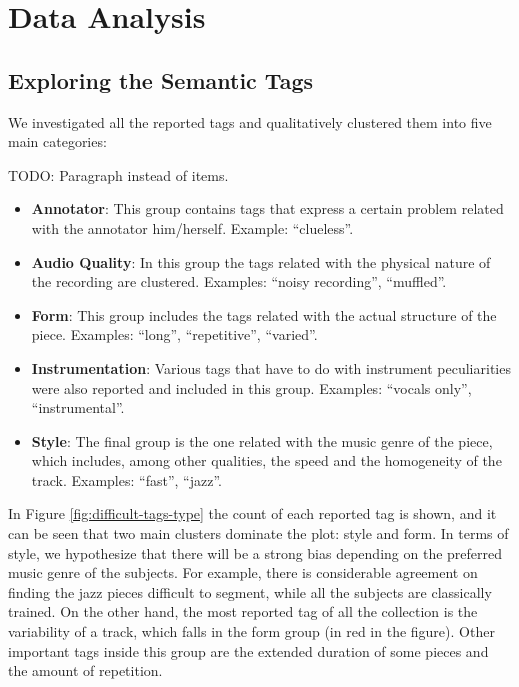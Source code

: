 \documentclass{article}
\begin{document}
\section{Data Analysis}

\subsection{Exploring the Semantic Tags}

We investigated all the reported tags and qualitatively clustered them into five main categories:

TODO: Paragraph instead of items.

\begin{itemize}
  \item
    \textbf{Annotator}: This group contains tags that express a certain problem related with the annotator him/herself. 
    Example: ``clueless''.

  \item
    \textbf{Audio Quality}: In this group the tags related with the physical nature of the recording are clustered. 
    Examples: ``noisy recording'', ``muffled''.

  \item
    \textbf{Form}: This group includes the tags related with the actual structure of the piece. Examples: ``long'', ``repetitive'', ``varied''.

  \item
    \textbf{Instrumentation}: Various tags that have to do with instrument peculiarities were also reported and included in this group. Examples: ``vocals only'', ``instrumental''.

  \item
    \textbf{Style}: The final group is the one related with the music genre of the piece, which includes, among other qualities, the speed and the homogeneity of the track. Examples: ``fast'', ``jazz''.
\end{itemize}

In Figure \ref{fig:difficult-tags-type} the count of each reported tag is shown, and it can be seen that two main clusters dominate the plot: style and form.
In terms of style, we hypothesize that there will be a strong bias depending on the preferred music genre of the subjects.
For example, there is considerable agreement on finding the jazz pieces difficult to segment, while all the subjects are classically trained.
On the other hand, the most reported tag of all the collection is the variability of a track, which falls in the form group (in red in the figure).
Other important tags inside this group are the extended duration of some pieces and the amount of repetition.
\end{document}

